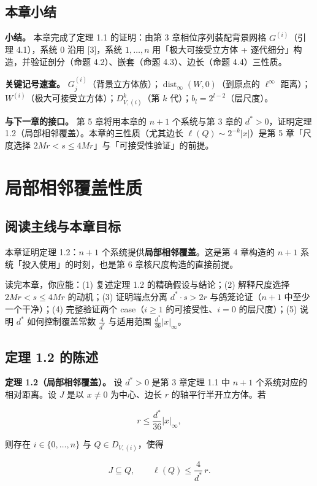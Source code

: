 \documentclass[a4paper,11pt,openany]{ctexbook}
\numberwithin{equation}{chapter}
\numberwithin{figure}{chapter}
\numberwithin{table}{chapter}
\begin{document}
\section{本章小结}

\textbf{小结。} 本章完成了定理 1.1 的证明：由第 3 章相位序列装配背景网格 $G^{(i)}$（引理 4.1），系统 0 沿用 [3]，系统 $1,\dots,n$ 用「极大可接受立方体 + 逐代细分」构造，并验证剖分（命题 4.2）、嵌套（命题 4.3）、边长（命题 4.4）三性质。

\textbf{关键记号速查。} $G_j^{(i)}$（背景立方体族）；$\operatorname{dist}_\infty(W,0)$（到原点的 $\ell^\infty$ 距离）；$W^{(i)}$（极大可接受立方体）；$D_{V,(i)}^k$（第 $k$ 代）；$b_l=2^{l-2}$（层尺度）。

\textbf{与下一章的接口。} 第 5 章将用本章的 $n+1$ 个系统与第 3 章的 $d^*>0$，证明定理 1.2（局部相邻覆盖）。本章的三性质（尤其边长 $\ell(Q)\sim2^{-k}|x|$）是第 5 章「尺度选择 $2M r<s\le4M r$」与「可接受性验证」的前提。


\clearpage

\chapter{局部相邻覆盖性质}
\section{阅读主线与本章目标}

本章证明定理 1.2：$n+1$ 个系统提供\textbf{局部相邻覆盖}。这是第 4 章构造的 $n+1$ 系统「投入使用」的时刻，也是第 6 章核尺度构造的直接前提。

读完本章，你应能：(1) 复述定理 1.2 的精确假设与结论；(2) 解释尺度选择 $2Mr<s\le4Mr$ 的动机；(3) 证明端点分离 $d^*\cdot s>2r$ 与鸽笼论证（$n+1$ 中至少一个干净）；(4) 完整验证两个 case（$i\ge1$ 的可接受性、$i=0$ 的层尺度）；(5) 说明 $d^*$ 如何控制覆盖常数 $\frac4{d^*}$ 与适用范围 $\frac{d^*}{36}|x|_\infty$。

\section{定理 1.2 的陈述}

\textbf{定理 1.2（局部相邻覆盖）。} 设 $d^*>0$ 是第 3 章定理 1.1 中 $n+1$ 个系统对应的相对距离。设 $J$ 是以 $x\neq0$ 为中心、边长 $r$ 的轴平行半开立方体。若

$$r\le\frac{d^*}{36}|x|_\infty,$$

则存在 $i\in\{0,\dots,n\}$ 与 $Q\in D_{V,(i)}$，使得

$$J\subseteq Q,\qquad \ell(Q)\le\frac4{d^*}\,r.$$
\end{document}
